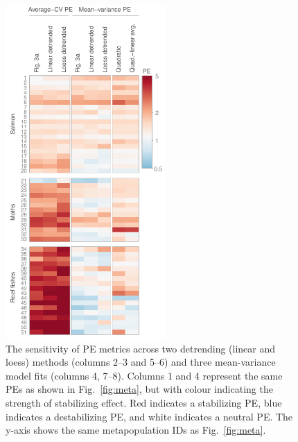 %
\clearpage
\begin{figure}[htbp]
  \centering \includegraphics[height=5in]{prophets/fig4}
  \caption[The sensitivity of PE metrics across two detrending methods and three mean-variance model fits.]{
  The sensitivity of PE metrics across two detrending (linear and
    loess) methods (columns 2--3 and 5--6) and three mean-variance model fits
    (columns 4, 7--8). Columns 1 and 4 represent the same PEs as shown in
    Fig.~\ref{fig:meta}, but with colour indicating the strength of stabilizing
    effect. Red indicates a stabilizing PE, blue indicates a destabilizing PE,
    and white indicates a neutral PE. The y-axis shows the same metapopulation
    IDs as Fig.~\ref{fig:meta}.
  }
  \label{fig:detrend}
\end{figure}

